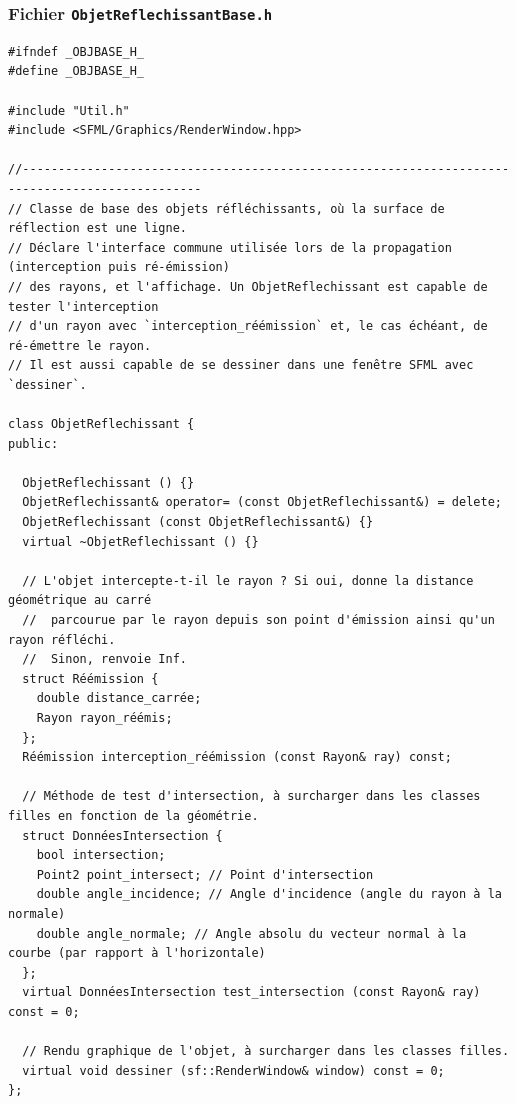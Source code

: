 \documentclass{book}
\def\filename{\texttt}
\begin{document}
\begin{correction}

\subsubsection*{Fichier \filename{ObjetReflechissantBase.h}}

\begin{verbatim}
#ifndef _OBJBASE_H_
#define _OBJBASE_H_

#include "Util.h"
#include <SFML/Graphics/RenderWindow.hpp>

//-----------------------------------------------------------------------------------------------
// Classe de base des objets réfléchissants, où la surface de réflection est une ligne.
// Déclare l'interface commune utilisée lors de la propagation (interception puis ré-émission)
// des rayons, et l'affichage. Un ObjetReflechissant est capable de tester l'interception
// d'un rayon avec `interception_réémission` et, le cas échéant, de ré-émettre le rayon.
// Il est aussi capable de se dessiner dans une fenêtre SFML avec `dessiner`.

class ObjetReflechissant {
public:
  
  ObjetReflechissant () {}
  ObjetReflechissant& operator= (const ObjetReflechissant&) = delete;
  ObjetReflechissant (const ObjetReflechissant&) {}
  virtual ~ObjetReflechissant () {}

  // L'objet intercepte-t-il le rayon ? Si oui, donne la distance géométrique au carré
  //  parcourue par le rayon depuis son point d'émission ainsi qu'un rayon réfléchi.
  //  Sinon, renvoie Inf.
  struct Réémission {
    double distance_carrée;
    Rayon rayon_réémis;
  };
  Réémission interception_réémission (const Rayon& ray) const;
  
  // Méthode de test d'intersection, à surcharger dans les classes filles en fonction de la géométrie.
  struct DonnéesIntersection {
    bool intersection;
    Point2 point_intersect; // Point d'intersection
    double angle_incidence; // Angle d'incidence (angle du rayon à la normale)
    double angle_normale; // Angle absolu du vecteur normal à la courbe (par rapport à l'horizontale)
  };
  virtual DonnéesIntersection test_intersection (const Rayon& ray) const = 0;

  // Rendu graphique de l'objet, à surcharger dans les classes filles.
  virtual void dessiner (sf::RenderWindow& window) const = 0;
};


\end{verbatim}
\end{correction}
\end{document}
